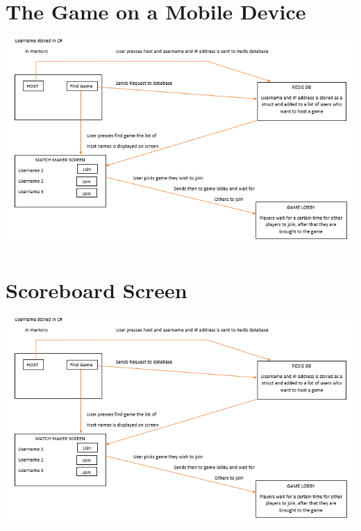 \section{The Game on a Mobile Device}

\includegraphics[width=1\columnwidth]{img/redisMatch.PNG}

\section{Scoreboard Screen}

\includegraphics[width=1\columnwidth]{img/redisMatch.PNG}